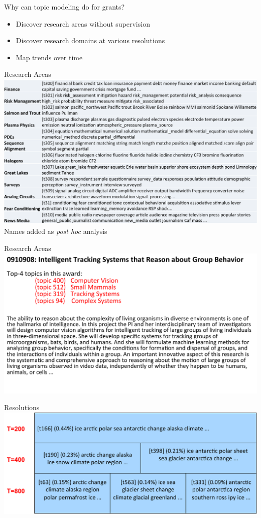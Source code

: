 
\begin{frame}{Why can topic modeling do for grants?}
  \begin{itemize}
    \item Discover research areas without supervision
    \item Discover research domains at various resolutions
    \item Map trends over time
  \end{itemize}
\end{frame}

\begin{frame}{Research Areas}
  \includegraphics[width=1.0\linewidth]{topic_models/nsf_topics} \\
  \pause
  \centering
  Names added as \emph{post hoc} analysis
\end{frame}

\begin{frame}{Research Areas}
  \includegraphics[width=1.0\linewidth]{topic_models/nsf_topic_ex}
\end{frame}

\begin{frame}{Resolutions}
  \includegraphics[width=1.0\linewidth]{topic_models/nsf_resolution}
\end{frame}

